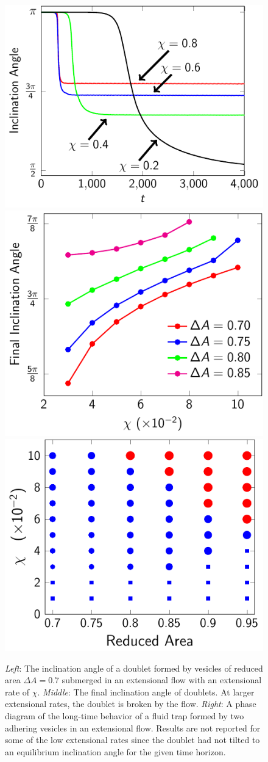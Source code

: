 \documentclass[prf,superscriptaddress,showpacs]{revtex4-1}
\begin{document}
\begin{figure}[htp]
  \includegraphics[height=0.27\textwidth]{figs/adR4em1adS7em1_ra070_inclinationAngle.pdf}
  \includegraphics[height=0.27\textwidth]{figs/adR4em1adS7em1_finalInclinationAngle.pdf}
  \includegraphics[height=0.27\textwidth]{figs/extensional_adR4em1adS7em1_phaseDiagram.pdf}
  \caption{\label{fig:extensionalInclinationAngle} {\em Left}: The
  inclination angle of a doublet formed by vesicles of reduced area
  $\Delta A = 0.7$ submerged in an extensional flow with an extensional
  rate of $\chi$.  {\em Middle}: The final inclination angle of doublets.
  At larger extensional rates, the doublet is broken by the flow.
  {\em Right}: A phase diagram of the long-time
  behavior of a fluid trap formed by two adhering vesicles in an
  extensional flow.
  Results are not reported for some of the low extensional rates since
  the doublet had not tilted to an equilibrium inclination angle for the
  given time horizon.}
\end{figure}
\end{document}
